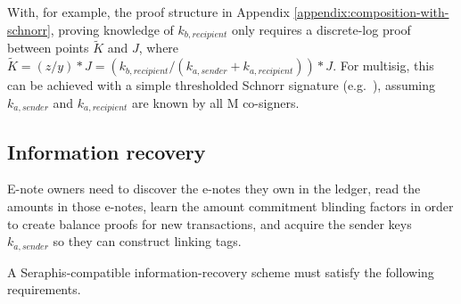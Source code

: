 \begin{itemize}
    With, for example, the proof structure in Appendix \ref{appendix:composition-with-schnorr}, proving knowledge of $k_{b, recipient}$ only requires a discrete-log proof between points $\tilde{K}$ and $J$, where $\tilde{K} = (z/y)*J = (k_{b, recipient}/(k_{a, sender} + k_{a, recipient}))*J$. For multisig, this can be achieved with a simple thresholded Schnorr signature (e.g.\ \cite{musig2-multisig, frost-multisig, multisig-security-simplemusig}), assuming $k_{a, sender}$ and $k_{a, recipient}$ are known by all M co-signers.
\end{itemize}


\subsection{Information recovery}
\label{subsec:seraphis-information-recovery}

E-note owners need to discover the e-notes they own in the ledger, read the amounts in those e-notes, learn the amount commitment blinding factors in order to create balance proofs for new transactions, and acquire the sender keys $k_{a,sender}$ so they can construct linking tags.

A Seraphis-compatible information-recovery scheme must satisfy the following requirements.

